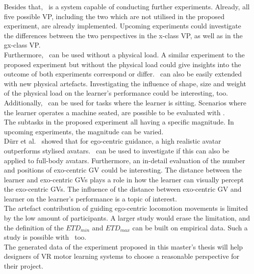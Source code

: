 Besides that, \exgo\ is a system capable of conducting further experiments. Already, all five possible VP, including the two which are not utilised in the proposed experiment, are already implemented. Upcoming experiments could investigate the differences between the two perspectives in the x-class VP, as well as in the gx-class VP.\\
Furthermore, \exgo\ can be used without a physical load. A similar experiment to the proposed experiment but without the physical load could give insights into the outcome of both experiments correspond or differ. \exgo\ can also be easily extended with new physical artefacts. Investigating the influence of shape, size and weight of the physical load on the learner's performance could be interesting, too. Additionally, \exgo\ can be used for tasks where the learner is sitting. Scenarios where the learner operates a machine seated, are possible to be evaluated with \exgo.\\
The subtasks in the proposed experiment all having a specific magnitude. In upcoming experiments, the magnitude can be varied.\\
Dürr et al.~\cite{max} showed that for ego-centric guidance, a high realistic avatar outperforms stylised avatars. \exgo\ can be used to investigate if this can also be applied to full-body avatars. Furthermore, an in-detail evaluation of the number and positions of exo-centric GV could be interesting. The distance between the learner and exo-centric GVs plays a role in how the learner can visually percept the exo-centric GVs. The influence of the distance between exo-centric GV and learner on the learner's performance is a topic of interest.\\
The artefact contribution of guiding ego-centric locomotion movements is limited by the low amount of participants. A larger study would erase the limitation, and the definition of the $ETD_{min}$ and $ETD_{max}$ can be built on empirical data. Such a study is possible with \exgo\, too.\\

The generated data of the experiment proposed in this master's thesis will help designers of VR motor learning systems to choose a reasonable perspective for their project.
